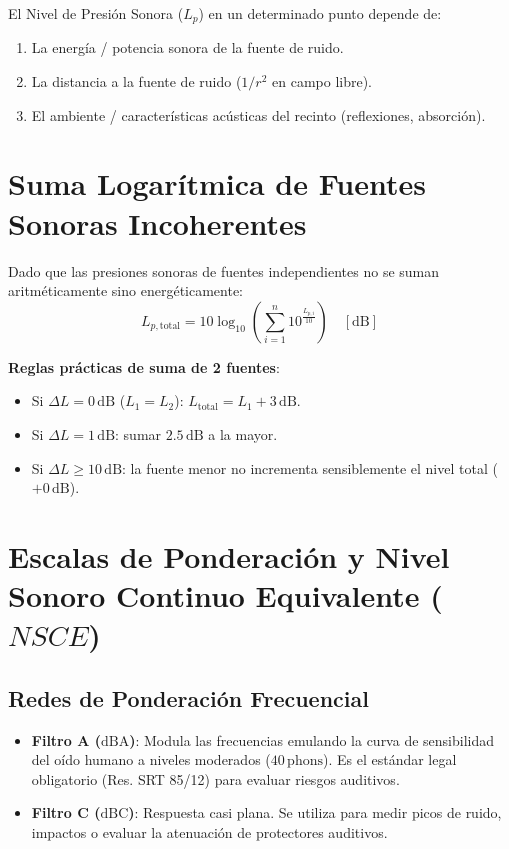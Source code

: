\documentclass[]{informeutn}
\begin{document}
\begin{tcolorbox}[title=Dependencia del Nivel de Presión Sonora en un Punto]
El Nivel de Presión Sonora ($L_p$) en un determinado punto depende de:
\begin{enumerate}
    \item La energía / potencia sonora de la fuente de ruido.
    \item La distancia a la fuente de ruido ($1/r^2$ en campo libre).
    \item El ambiente / características acústicas del recinto (reflexiones, absorción).
\end{enumerate}
\end{tcolorbox}

\section{Suma Logarítmica de Fuentes Sonoras Incoherentes}
Dado que las presiones sonoras de fuentes independientes no se suman aritméticamente sino energéticamente:
\begin{equation}
L_{p,\text{total}} = 10 \log_{10} \left( \sum_{i=1}^n 10^{\frac{L_{p,i}}{10}} \right) \quad [\text{dB}]
\end{equation}

\textbf{Reglas prácticas de suma de 2 fuentes}:
\begin{itemize}
    \item Si $\Delta L = 0\,\text{dB}$ ($L_1 = L_2$): $L_{\text{total}} = L_1 + 3\,\text{dB}$.
    \item Si $\Delta L = 1\,\text{dB}$: sumar $2.5\,\text{dB}$ a la mayor.
    \item Si $\Delta L \ge 10\,\text{dB}$: la fuente menor no incrementa sensiblemente el nivel total ($+0\,\text{dB}$).
\end{itemize}

\section{Escalas de Ponderación y Nivel Sonoro Continuo Equivalente ($NSCE$)}

\subsection{Redes de Ponderación Frecuencial}
\begin{itemize}
    \item \textbf{Filtro A ($\text{dBA}$)}: Modula las frecuencias emulando la curva de sensibilidad del oído humano a niveles moderados ($40\,\text{phons}$). Es el estándar legal obligatorio (Res. SRT 85/12) para evaluar riesgos auditivos.
    \item \textbf{Filtro C ($\text{dBC}$)}: Respuesta casi plana. Se utiliza para medir picos de ruido, impactos o evaluar la atenuación de protectores auditivos.
\end{itemize}
\end{document}
